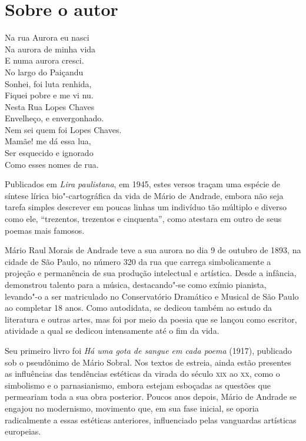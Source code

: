 
\section{Sobre o autor}

\epigraph{Na rua Aurora eu nasci\\
Na aurora de minha vida\\
E numa aurora cresci.\\[5pt]
No largo do Paiçandu\\
Sonhei, foi luta renhida,\\
Fiquei pobre e me vi nu.\\[5pt]
Nesta Rua Lopes Chaves\\
Envelheço, e envergonhado.\\
Nem sei quem foi Lopes Chaves.\\[5pt]
Mamãe! me dá essa lua,\\
Ser esquecido e ignorado\\
Como esses nomes de rua.}{}

\noindent{}Publicados em
\emph{Lira paulistana}, em 1945, estes versos traçam uma espécie de
síntese lírica bio"-cartográfica da vida de Mário de Andrade, embora não
seja tarefa simples descrever em poucas linhas um indivíduo tão múltiplo
e diverso como ele, ``trezentos, trezentos e cinquenta'', como atestara
em outro de seus poemas mais famosos.

Mário Raul Morais de Andrade teve a sua aurora no dia 9 de outubro de
1893, na cidade de São Paulo, no número 320 da rua que carrega
simbolicamente a projeção e permanência de sua produção intelectual e
artística. Desde a infância, demonstrou talento para a música,
destacando"-se como exímio pianista, levando"-o a ser matriculado no
Conservatório Dramático e Musical de São Paulo ao completar 18 anos.
Como autodidata, se dedicou também ao estudo da literatura e outras
artes, mas foi por meio da poesia que se lançou como escritor, atividade
a qual se dedicou intensamente até o fim da vida.

Seu primeiro livro foi \emph{Há uma gota de sangue em cada poema}
(1917), publicado sob o pseudônimo de Mário Sobral. Nos textos de
estreia, ainda estão presentes as influências das tendências estéticas
da virada do século \textsc{xix} ao \textsc{xx}, como o simbolismo e o parnasianismo,
embora estejam esboçadas as questões que permeariam toda a sua obra
posterior. Poucos anos depois, Mário de Andrade se engajou no
modernismo, movimento que, em sua fase inicial, se oporia radicalmente a
essas estéticas anteriores, influenciado pelas vanguardas artísticas
europeias.

